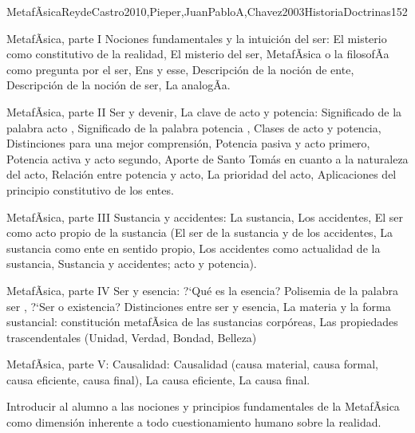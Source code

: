 \begin{syllabus}
\begin{unit}{MetafÃ­sica}{ReydeCastro2010,Pieper,JuanPabloA,Chavez2003HistoriaDoctrinas}{15}{2}
\begin{topics}
	\item MetafÃ­sica, parte I  Nociones fundamentales y la intuición del ser: El misterio como constitutivo de la realidad, El misterio del ser, MetafÃ­sica o la filosofÃ­a como pregunta por el ser, Ens y esse, Descripción de la noción de ente, Descripción de la noción de ser, La analogÃ­a.
	\item MetafÃ­sica, parte II  Ser y devenir, La clave de acto y potencia: Significado de la palabra  acto , Significado de la palabra  potencia , Clases de acto y potencia, Distinciones para una mejor comprensión, Potencia pasiva y acto primero, Potencia activa y acto segundo, Aporte de Santo Tomás en cuanto a la naturaleza del acto, Relación entre potencia y acto, La prioridad del acto, Aplicaciones del principio constitutivo de los entes.
	\item MetafÃ­sica, parte III  Sustancia y accidentes: La sustancia, Los accidentes, El ser como acto propio de la sustancia (El ser de la sustancia y de los accidentes, La sustancia como ente en sentido propio, Los accidentes como actualidad de la sustancia, Sustancia y accidentes; acto y potencia).
	\item MetafÃ­sica, parte IV  Ser y esencia: ?`Qué es la esencia? Polisemia de la palabra  ser , ?`Ser o existencia? Distinciones entre ser y esencia, La materia y la forma sustancial: constitución metafÃ­sica de las sustancias corpóreas, Las propiedades trascendentales (Unidad, Verdad, Bondad, Belleza)
	\item MetafÃ­sica, parte V: Causalidad: Causalidad (causa material, causa formal, causa eficiente, causa final), La causa eficiente, La causa final.
\end{topics}

\begin{unitgoals}
	\item Introducir al alumno a las nociones y principios fundamentales de la MetafÃ­sica como dimensión inherente a todo cuestionamiento humano sobre la realidad.
\end{unitgoals}
\end{unit}



\begin{coursebibliography}
\end{coursebibliography}

\end{syllabus}
